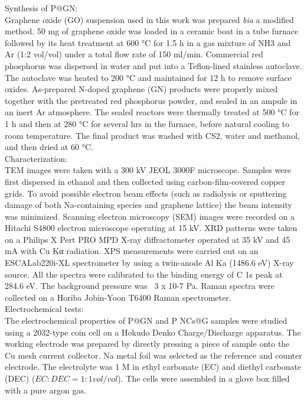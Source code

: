 Synthesis of P@GN: \\
Graphene oxide (GO) suspension used in this work was prepared \textit{bia} a modified method. 50 mg of graphene oxide was loaded in a ceramic boat in a tube furnace followed by its heat treatment at 600 °C for 1.5 h in a gas mixture of NH3 and Ar (1:2 vol/vol) under a total flow rate of 150 ml/min. Commercial red phosphorus was dispersed in water and put into a Teflon-lined stainless autoclave. The autoclave was heated to 200 °C and maintained for 12 h to remove surface oxides. As-prepared N-doped graphene (GN) products were properly mixed together with the pretreated red phosphorus powder, and sealed in an ampule in an inert Ar atmosphere. The sealed reactors were thermally treated at 500 °C for 1 h and then at 280 °C for several hrs in the furnace, before natural cooling to room temperature. The final product was washed with CS2, water and methanol, and then dried at 60 °C.\\

Characterization: \\
TEM images were taken with a 300 kV JEOL 3000F microscope. Samples were first dispersed in ethanol and then collected using carbon-film-covered copper grids. To avoid possible electron beam effects (such as radiolysis or sputtering damage of both Na-containing species and graphene lattice) the beam intensity was minimized. Scanning electron microscopy (SEM) images were recorded on a Hitachi S4800 electron microscope operating at 15 kV. XRD patterns were taken on a Philips X Pert PRO MPD X-ray diffractometer operated at 35 kV and 45 mA with Cu Kα radiation. XPS measurements were carried out on an ESCALab220i-XL spectrometer by using a twin-anode Al Ka (1486.6 eV) X-ray source. All the spectra were calibrated to the binding energy of C 1s peak at 284.6 eV. The background pressure was ~3 x 10-7 Pa. Raman spectra were collected on a Horiba Jobin-Yoon T6400 Raman spectrometer.\\

Electrochemical tests: \\
The electrochemical properties of P@GN and P NCs@G samples were studied using a 2032-type coin cell on a Hokudo Denko Charge/Discharge apparatus. The working electrode was prepared by directly pressing a piece of sample onto the Cu mesh current collector. Na metal foil was selected as the reference and counter electrode. The electrolyte was 1 M  in ethyl carbonate (EC) and diethyl carbonate (DEC) ($EC : DEC = 1 : 1 vol/vol$). The cells were assembled in a glove box filled with a pure argon gas.\\ 

